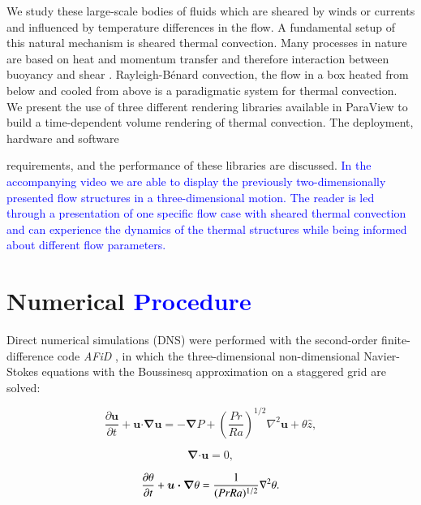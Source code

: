 \documentclass[5p,times]{elsarticle}
\begin{document}
We study these large-scale bodies of fluids which are sheared by winds or currents and influenced by temperature differences in the flow. A fundamental setup of this natural mechanism is sheared thermal convection. Many processes in nature are based on heat and momentum transfer and therefore interaction between buoyancy \cite{ahl09,loh10} and shear \cite{smi11,bar07}. Rayleigh-B\'enard convection, the flow in a box heated from below and cooled from above is a paradigmatic system for thermal convection. We present the use of three different rendering libraries available in ParaView \cite{Ahrens2005} to build a time-dependent volume rendering of thermal convection. The deployment, hardware and software

requirements, and the performance of these libraries are discussed. \textcolor{blue}{In the accompanying video \cite{fav18} we are able to display the previously two-dimensionally presented flow structures in a three-dimensional motion. The reader is led through a presentation of one specific flow case with sheared thermal convection and can experience the dynamics of the thermal structures while being informed about different flow parameters. }

\section{Numerical \textcolor{blue}{Procedure}}
Direct numerical simulations (DNS) were performed with the second-order finite-difference
code \textit{AFiD} \cite{poe15c}, in which the three-dimensional non-dimensional
Navier-Stokes equations with the Boussinesq approximation on a staggered grid are solved:

\begin{equation} %
\frac{\partial \boldsymbol{u}}{\partial t} + \boldsymbol{u} \bm{\cdot} \bm{\nabla} \boldsymbol{u} =-\bm{\nabla} P + \left(\frac{Pr}{Ra} \right)^{1/2} \nabla^2\boldsymbol{u}+\theta \hat{z}, 
\label{eqn:NS}
\end{equation}

\begin{equation} %
\bm{\nabla} \bm{\cdot} \boldsymbol{u} =0,
\label{eqn:div}
\end{equation}

\begin{equation} %
\frac{\partial \theta}{\partial t} + \boldsymbol{u} \bm{\cdot} \bm{\nabla} \theta = \frac{1}{(Pr Ra)^{1/2}} \nabla ^2 \theta.
\label{eqn:temp} \\[8pt]
\end{equation}
\end{document}
